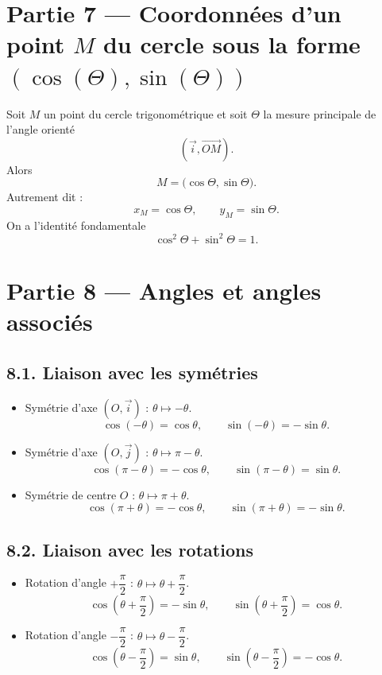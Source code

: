 \documentclass[11pt,a4paper]{article}
\begin{document}
\clearpage
\section*{Partie 7 — Coordonnées d'un point $M$ du cercle sous la forme $(\cos(\Theta),\sin(\Theta))$}

Soit $M$ un point du cercle trigonométrique et soit $\Theta$ la mesure principale de l'angle orienté
\[
\left(\vec{i},\overrightarrow{OM}\right).
\]
Alors
\[
M=\bigl(\cos\Theta,\sin\Theta\bigr).
\]
Autrement dit :
\[
x_M=\cos\Theta,\qquad y_M=\sin\Theta.
\]
On a l'identité fondamentale
\[
\cos^2\Theta+\sin^2\Theta=1.
\]

\clearpage
\section*{Partie 8 — Angles et angles associés}

\subsection*{8.1. Liaison avec les symétries}

\begin{itemize}
  \item Symétrie d'axe $(O,\vec{i})$ : $\theta\mapsto -\theta$.
  \[
  \cos(-\theta)=\cos\theta,\qquad \sin(-\theta)=-\sin\theta.
  \]

  \item Symétrie d'axe $(O,\vec{j})$ : $\theta\mapsto \pi-\theta$.
  \[
  \cos(\pi-\theta)=-\cos\theta,\qquad \sin(\pi-\theta)=\sin\theta.
  \]

  \item Symétrie de centre $O$ : $\theta\mapsto \pi+\theta$.
  \[
  \cos(\pi+\theta)=-\cos\theta,\qquad \sin(\pi+\theta)=-\sin\theta.
  \]
\end{itemize}

\subsection*{8.2. Liaison avec les rotations}

\begin{itemize}
  \item Rotation d'angle $+\dfrac{\pi}{2}$ : $\theta\mapsto \theta+\dfrac{\pi}{2}$.
  \[
  \cos\left(\theta+\dfrac{\pi}{2}\right)=-\sin\theta,\qquad
  \sin\left(\theta+\dfrac{\pi}{2}\right)=\cos\theta.
  \]

  \item Rotation d'angle $-\dfrac{\pi}{2}$ : $\theta\mapsto \theta-\dfrac{\pi}{2}$.
  \[
  \cos\left(\theta-\dfrac{\pi}{2}\right)=\sin\theta,\qquad
  \sin\left(\theta-\dfrac{\pi}{2}\right)=-\cos\theta.
  \]
\end{itemize}
\end{document}
